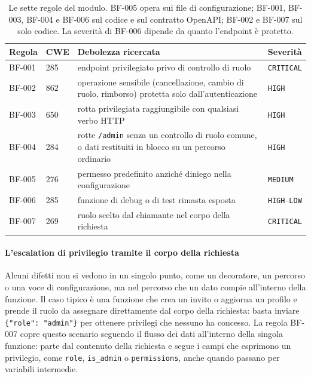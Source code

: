 \begin{table}[htbp]
  \centering
  \small
  \linespread{1.0}\selectfont
  \renewcommand{\arraystretch}{1.15}
  \begin{tabularx}{\linewidth}{@{}l l X l@{}}
    \toprule
    \textbf{Regola} & \textbf{CWE} & \textbf{Debolezza ricercata} & \textbf{Severità} \\
    \midrule
    BF-001 & 285~\cite{cwe285} & endpoint privilegiato privo di controllo di ruolo & \texttt{CRITICAL} \\
    BF-002 & 862~\cite{cwe862} & operazione sensibile (cancellazione, cambio di ruolo, rimborso) protetta solo dall'autenticazione & \texttt{HIGH} \\
    BF-003 & 650~\cite{cwe650} & rotta privilegiata raggiungibile con qualsiasi verbo HTTP & \texttt{HIGH} \\
    BF-004 & 284~\cite{cwe284} & rotte \texttt{/admin} senza un controllo di ruolo comune, o dati restituiti in blocco su un percorso ordinario & \texttt{HIGH} \\
    BF-005 & 276~\cite{cwe276} & permesso predefinito anziché diniego nella configurazione & \texttt{MEDIUM} \\
    BF-006 & 285~\cite{cwe285} & funzione di debug o di test rimasta esposta & \texttt{HIGH}--\texttt{LOW} \\
    BF-007 & 269~\cite{cwe269} & ruolo scelto dal chiamante nel corpo della richiesta & \texttt{CRITICAL} \\
    \bottomrule
  \end{tabularx}
  \caption[Regole del modulo Broken Function Level Authorization]{Le sette regole
    del modulo. \mbox{BF-005} opera sui file di configurazione; \mbox{BF-001},
    \mbox{BF-003}, \mbox{BF-004} e \mbox{BF-006} sul codice e sul contratto
    OpenAPI; \mbox{BF-002} e \mbox{BF-007} sul solo codice. La severità di
    \mbox{BF-006} dipende da quanto l'endpoint è protetto.}
  \label{tab:regole-bfla}
\end{table}

\paragraph{L'escalation di privilegio tramite il corpo della richiesta}
Alcuni difetti non si vedono in un singolo punto, come un decoratore, un
percorso o una voce di configurazione, ma nel percorso che un dato compie
all'interno della funzione. Il caso tipico è una funzione che crea un invito o
aggiorna un profilo e prende il ruolo da assegnare direttamente dal corpo della
richiesta: basta inviare \texttt{\{"role": "admin"\}} per ottenere privilegi che
nessuno ha concesso. La regola BF-007 copre questo scenario seguendo il flusso
dei dati all'interno della singola funzione: parte dal contenuto della
richiesta e segue i campi che esprimono un privilegio, come \texttt{role},
\texttt{is\_admin} o \texttt{permissions}, anche quando passano per variabili
intermedie.

